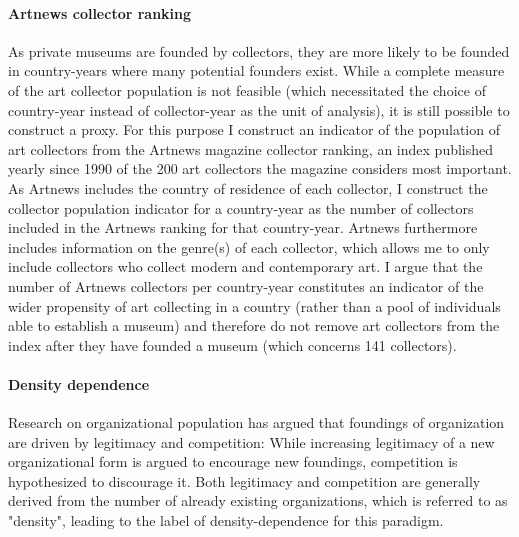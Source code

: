 \documentclass[11pt]{article}
\begin{document}
\paragraph*{Artnews collector ranking}

As private museums are founded by collectors, they are more likely to be founded in country-years where many potential founders exist.
While a complete measure of the art collector population is not feasible (which necessitated the choice of country-year instead of collector-year as the unit of analysis), it is still possible to construct a proxy. 
For this purpose I construct an indicator of the population of art collectors from the Artnews magazine collector ranking, an index published yearly since 1990 of the 200 art collectors the magazine considers most important.
As Artnews includes the country of residence of each collector, I construct the collector population indicator for a country-year as the number of collectors included in the Artnews ranking for that country-year.
Artnews furthermore includes information on the genre(s) of each collector, which allows me to only include collectors who collect modern and contemporary art.
I argue that the number of Artnews collectors per country-year constitutes an indicator of the wider propensity of art collecting in a country (rather than a pool of individuals able to establish a museum) and therefore do not remove art collectors from the index after they have founded a museum (which concerns 141 collectors).



\paragraph*{Density dependence}

Research on organizational population \parencite{Carroll_1989_density,Hannan_1992_dynamics} has argued that foundings of organization are driven by legitimacy and competition:
While increasing legitimacy of a new organizational form is argued to encourage new foundings, competition is hypothesized to discourage it.
Both legitimacy and competition are generally derived from the number of already existing organizations, which is referred to as "density", leading to the label of density-dependence for this paradigm. 
\end{document}
